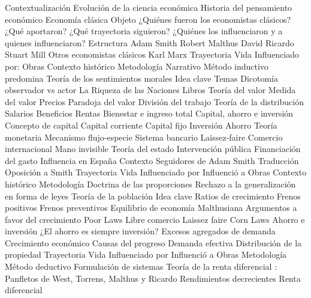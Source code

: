 \documentclass{nuevotema}
\begin{document}
\begin{esquema}[enumerate]
	\1[] 
		\2 Contextualización
			\3 Evolución de la ciencia económica
			\3 Historia del pensamiento económico
			\3 Economía clásica
		\2 Objeto
			\3 ¿Quiénes fueron los economistas clásicos?
			\3 ¿Qué aportaron?
			\3 ¿Qué trayectoria siguieron?
			\3 ¿Quiénes los influenciaron y a quienes influenciaron?
		\2 Estructura
			\3 Adam Smith
			\3 Robert Malthus
			\3 David Ricardo
			\3 Stuart Mill
			\3 Otros economistas clásicos
			\3 Karl Marx
	\1 
		\2 Trayectoria
			\3 Vida
			\3 Influenciado por:
			\3 Obras
			\3 Contexto histórico
		\2 Metodología
			\3 Narrativo
			\3 Método inductivo predomina
		\2 Teoría de los sentimientos morales
			\3 Idea clave
			\3 Temas
			\3 Dicotomía observador vs actor
		\2 La Riqueza de las Naciones
			\3 Libros
		\2 Teoría del valor
			\3 Medida del valor
			\3 Precios
			\3 Paradoja del valor
			\3 División del trabajo
		\2 Teoría de la distribución
			\3 Salarios
			\3 Beneficios
			\3 Rentas
			\3 Bienestar e ingreso total
		\2 Capital, ahorro e inversión
			\3 Concepto de capital
			\3 Capital corriente
			\3 Capital fijo
			\3 Inversión
			\3 Ahorro
		\2 Teoría monetaria
			\3 Mecanismo flujo-especie
			\3 Sistema bancario
		\2 Laissez-faire
			\3 Comercio internacional
			\3 Mano invisible
		\2 Teoría del estado
			\3 Intervención pública
			\3 Financiación del gasto
		\2 Influencia en España
			\3 Contexto
			\3 Seguidores de Adam Smith
			\3 Traducción
			\3 Oposición a Smith
	\1 
		\2 Trayectoria
			\3 Vida
			\3 Influenciado por
			\3 Influenció a
			\3 Obras
			\3 Contexto histórico
		\2 Metodología
			\3 Doctrina de las proporciones
			\3 Rechazo a la generalización en forma de leyes
		\2 Teoría de la población
			\3 Idea clave
			\3 Ratios de crecimiento
			\3 Frenos positivos
			\3 Frenos preventivos
			\3 Equilibrio de economía Malthusiana
			\3 Argumentos a favor del crecimiento
			\3 Poor Laws
		\2 Libre comercio
			\3 Laissez faire
			\3 Corn Laws
		\2 Ahorro e inversión
			\3 ¿El ahorro es siempre inversión?
			\3 Excesos agregados de demanda
		\2 Crecimiento económico
			\3 Causas del progreso
			\3 Demanda efectiva
			\3 Distribución de la propiedad
	\1 
		\2 Trayectoria
			\3 Vida
			\3 Influenciado por
			\3 Influenció a
			\3 Obras
		\2 Metodología
			\3 Método deductivo
			\3 Formulación de sistemas
		\2 Teoría de la renta diferencial
			: Panfletos de West, Torrens, Malthus y Ricardo
			\3 Rendimientos decrecientes
			\3 Renta diferencial

\end{esquema}
\end{document}
